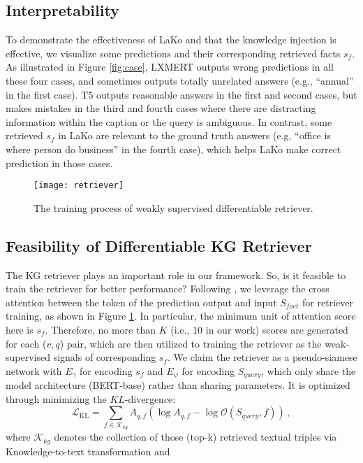 \documentclass[sigconf]{acmart}
\newcommand{\cjy}[1]{{\color{black}#1}}
\begin{document}
 \vspace{-1mm}
\subsection{Interpretability}\label{fig:interpretability}
\cjy{To demonstrate the effectiveness of LaKo and that the knowledge injection is effective,
we visualize some predictions and their corresponding retrieved facts $s_f$.
As illustrated in Figure \ref{fig:case}, LXMERT  outputs wrong predictions in all these four cases, and sometimes outputs totally unrelated answers (e.g., ``annual'' in the first case).
T5 outputs reasonable answers in the first and second cases, but makes mistakes in the third and fourth cases where there are distracting information within the caption or the query is ambiguous.
In contrast, some retrieved $s_f$ in LaKo are relevant to the ground truth answers (e.g, ``office is where person do business'' in the fourth case), which helps LaKo make correct prediction in those cases.
}
\begin{figure}[htbp]
\texttt{[image: retriever]}
    \caption{The training process of weakly supervised differentiable retriever.
    } 
  \label{fig:retriever}
  \vspace{-2mm}
\end{figure}

\subsection{Feasibility of Differentiable KG Retriever}\label{sec:differentiable_retriever}
\cjy{The KG retriever} plays an important role in our framework. So, \cjy{is it feasible to train the retriever for better performance?}
Following \citep{DBLP:conf/iclr/IzacardG21}, we leverage the cross attention between the token of the prediction output and input $S_{fact}$ for retriever training, as shown in Figure \ref{fig:retriever}. 
In particular, the minimum unit of attention score here is $s_f$. Therefore, no more than $K$ (i.e., 10 in our work) scores are generated for each ($v,q$) pair, which are then utilized to training the retriever as the weak-supervised signals of corresponding $s_f$. 
We claim the retriever as a pseudo-siamese network \cite{DBLP:conf/cvpr/ChenH21} with $E_{\gamma}$ for encoding $s_f$ and $E_{\psi}$  for encoding $S_{query}$, which only share the model architecture (BERT-base) rather than sharing parameters.
It is optimized through minimizing the $KL$-divergence:
\begin{equation}
\mathcal{L}_{\mathrm{KL}}=
\sum_{f \in \mathcal{K}_{kg}} {A}_{q, f}\left(\log {A}_{q, f}-\log \mathcal{O}(S_{query}, f)\right)\,,
\end{equation}
where $\mathcal{K}_{kg}$ denotes the collection of those (top-k) retrieved textual triples  via Knowledge-to-text transformation and 
\end{document}
